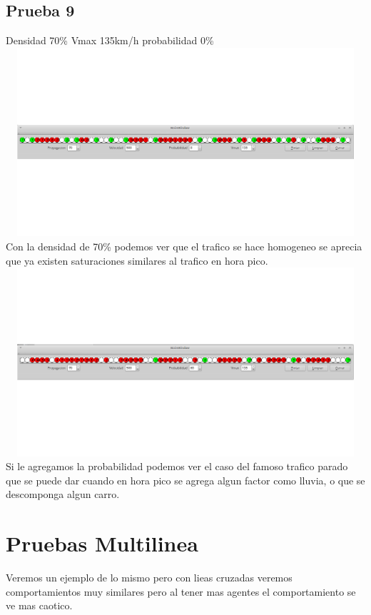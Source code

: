 \documentclass[a4paper,10pt]{article}
\begin{document}
\subsection{Prueba 9}
Densidad 70\% Vmax 135km/h probabilidad 0\%
\\
\includegraphics[width=15cm, height=7cm]{30}
\\
Con la densidad de 70\% podemos ver que el trafico se hace homogeneo se aprecia que ya existen saturaciones similares al trafico en hora pico.
\\
\includegraphics[width=15cm, height=7cm]{31}
\\
Si le agregamos la probabilidad podemos ver el caso del famoso trafico parado que se puede dar cuando en hora pico se agrega algun factor como lluvia, o que se descomponga algun carro.
\section{Pruebas Multilinea}

Veremos un ejemplo de lo mismo pero con lieas cruzadas veremos comportamientos muy similares pero al tener mas agentes el comportamiento se ve mas caotico.
\end{document}
